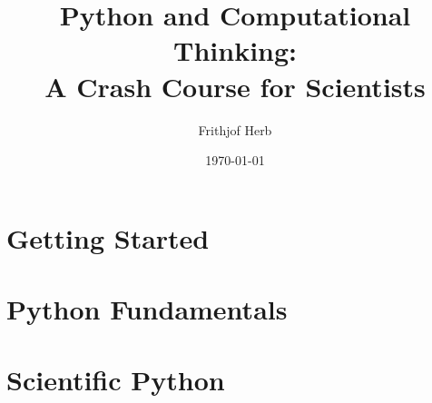 


\title{Python and Computational Thinking:\\[0.5em]
       \Large A Crash Course for Scientists}
\author{Frithjof Herb}
\date{\today}



\frontmatter



\tableofcontents




\mainmatter

\part{Getting Started}


\part{Python Fundamentals}








\part{Scientific Python}





